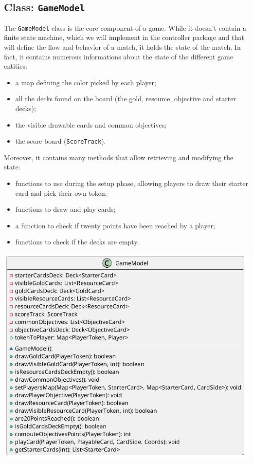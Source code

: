 \documentclass{article}
\begin{document}
\subsection[1]{Class: \texttt{GameModel}}
The \texttt{GameModel} class is the core component of a game.
While it doesn't contain a finite state machine, which we will implement in the controller package and that will define the flow and behavior of a match, it holds the state of the match.
In fact, it contains numerous informations about the state of the different game entities:
\begin{itemize}
    \item a map defining the color picked by each player;
    \item all the decks found on the board (the gold, resource, objective and starter decks);
    \item the visible drawable cards and common objectives;
    \item the score board (\texttt{ScoreTrack}).
\end{itemize}
Moreover, it contains many methods that allow retrieving and modifying the state:
\begin{itemize}
    \item functions to use during the setup phase, allowing players to draw their starter card and pick their own token;
    \item functions to draw and play cards;
    \item a function to check if twenty points have been reached by a player;
    \item functions to check if the decks are empty.
\end{itemize}

\begin{center}
    \includegraphics[scale=0.25]{GameModel.png}
\end{center}
\end{document}
